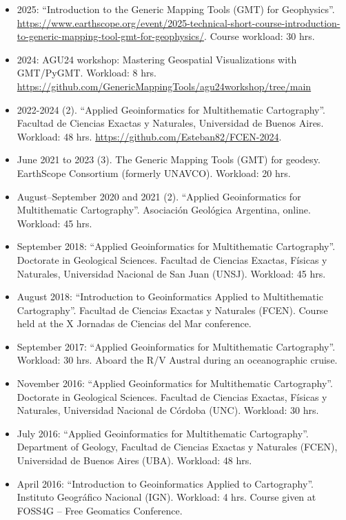 \documentclass[11pt, a4paper]{article}
\begin{document}
\begin{itemize}
  \item 2025: “Introduction to the Generic Mapping Tools (GMT) for Geophysics”. \url{https://www.earthscope.org/event/2025-technical-short-course-introduction-to-generic-mapping-tool-gmt-for-geophysics/}. Course workload: 30 hrs.
  \item 2024: AGU24 workshop: Mastering Geospatial Visualizations with GMT/PyGMT. Workload: 8 hrs. \url{https://github.com/GenericMappingTools/agu24workshop/tree/main}
  \item 2022-2024 (2). “Applied Geoinformatics for Multithematic Cartography”. Facultad de Ciencias Exactas y Naturales, Universidad de Buenos Aires. Workload: 48 hrs. \url{https://github.com/Esteban82/FCEN-2024}.
  \item June 2021 to 2023 (3). The Generic Mapping Tools (GMT) for geodesy. EarthScope Consortium (formerly UNAVCO). Workload: 20 hrs.
  \item August--September 2020 and 2021 (2). “Applied Geoinformatics for Multithematic Cartography”. Asociación Geológica Argentina, online. Workload: 45 hrs.
  \item September 2018: “Applied Geoinformatics for Multithematic Cartography”. Doctorate in Geological Sciences. Facultad de Ciencias Exactas, Físicas y Naturales, Universidad Nacional de San Juan (UNSJ). Workload: 45 hrs.
  \item August 2018: “Introduction to Geoinformatics Applied to Multithematic Cartography”. Facultad de Ciencias Exactas y Naturales (FCEN). Course held at the X Jornadas de Ciencias del Mar conference.
  \item September 2017: “Applied Geoinformatics for Multithematic Cartography”. Workload: 30 hrs. Aboard the R/V Austral during an oceanographic cruise.
  \item November 2016: “Applied Geoinformatics for Multithematic Cartography”. Doctorate in Geological Sciences. Facultad de Ciencias Exactas, Físicas y Naturales, Universidad Nacional de Córdoba (UNC). Workload: 30 hrs.
  \item July 2016: “Applied Geoinformatics for Multithematic Cartography”. Department of Geology, Facultad de Ciencias Exactas y Naturales (FCEN), Universidad de Buenos Aires (UBA). Workload: 48 hrs.
  \item April 2016: “Introduction to Geoinformatics Applied to Cartography”. Instituto Geográfico Nacional (IGN). Workload: 4 hrs. Course given at FOSS4G -- Free Geomatics Conference.
\end{itemize}
\end{document}

